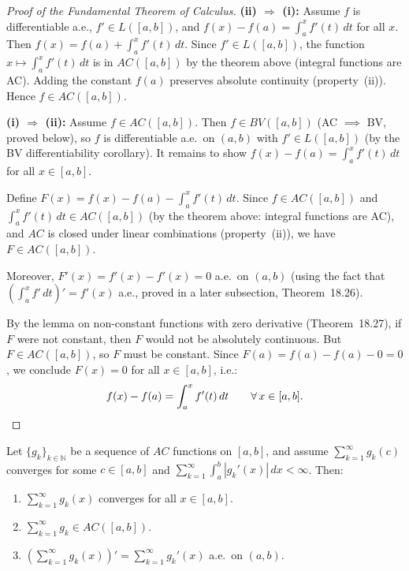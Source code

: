 \documentclass[11pt]{report}
\begin{document}
\begin{proof}[Proof of the Fundamental Theorem of Calculus]\leavevmode

\textbf{(ii) $\boldsymbol{\Rightarrow}$ (i):} Assume $f$ is differentiable a.e., $f' \in L([a, b])$, and $f(x) - f(a) = \int_a^x f'(t)\,dt$ for all $x$. Then $f(x) = f(a) + \int_a^x f'(t)\,dt$. Since $f' \in L([a,b])$, the function $x \mapsto \int_a^x f'(t)\,dt$ is in $AC([a, b])$ by the theorem above (integral functions are AC). Adding the constant $f(a)$ preserves absolute continuity (property~(ii)). Hence $f \in AC([a, b])$.

\textbf{(i) $\boldsymbol{\Rightarrow}$ (ii):} Assume $f \in AC([a, b])$. Then $f \in BV([a, b])$ (AC $\implies$ BV, proved below), so $f$ is differentiable a.e.\ on $(a, b)$ with $f' \in L([a, b])$ (by the BV differentiability corollary). It remains to show $f(x) - f(a) = \int_a^x f'(t)\,dt$ for all $x \in [a, b]$.

Define $F(x) = f(x) - f(a) - \int_a^x f'(t)\,dt$. Since $f \in AC([a, b])$ and $\int_a^x f'(t)\,dt \in AC([a, b])$ (by the theorem above: integral functions are AC), and $AC$ is closed under linear combinations (property~(ii)), we have $F \in AC([a, b])$.

Moreover, $F'(x) = f'(x) - f'(x) = 0$ a.e.\ on $(a, b)$ (using the fact that $(\int_a^x f'\,dt)' = f'(x)$ a.e., proved in a later subsection, Theorem~18.26).

By the lemma on non-constant functions with zero derivative (Theorem~18.27), if $F$ were not constant, then $F$ would not be absolutely continuous. But $F \in AC([a, b])$, so $F$ must be constant. Since $F(a) = f(a) - f(a) - 0 = 0$, we conclude $F(x) = 0$ for all $x \in [a, b]$, i.e.:
\[
f(x) - f(a) = \int_a^x f'(t)\,dt \qquad \forall\, x \in [a, b]. \qedhere
\]
\end{proof}

\begin{corbox}
Let $\{g_k\}_{k \in \mathbb{N}}$ be a sequence of $AC$ functions on $[a, b]$, and assume $\sum_{k=1}^{\infty} g_k(c)$ converges for some $c \in [a, b]$ and $\sum_{k=1}^{\infty} \int_a^b |g_k'(x)|\,dx < \infty$. Then:
\begin{enumerate}[label=(\roman*)]
\item $\sum_{k=1}^{\infty} g_k(x)$ converges for all $x \in [a, b]$.
\item $\sum_{k=1}^{\infty} g_k \in AC([a, b])$.
\item $\left(\sum_{k=1}^{\infty} g_k(x)\right)' = \sum_{k=1}^{\infty} g_k'(x)$ a.e.\ on $(a, b)$.
\end{enumerate}
\end{corbox}
\end{document}
